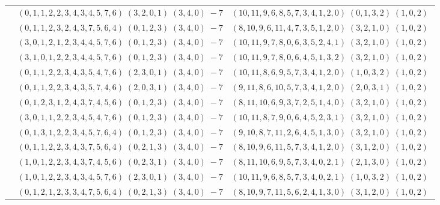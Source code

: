 \documentclass[11pt]{article}
\begin{document}
\begin{longtable}[l]{|c|c|c|}
 \cline{2-3} 
 & $(0 ,1 ,1 ,2 ,2 ,3 ,4 ,3 ,4 ,5 ,7 ,6) \;(3 ,2 ,0 ,1) \;(3 ,4 ,0) \;-7$ & $(10 ,11 ,9 ,6 ,8 ,5 ,7 ,3 ,4 ,1 ,2 ,0) \;(0 ,1 ,3 ,2) \;(1 ,0 ,2) \;$\\ 
 \cline{2-3} 
 & $(0 ,1 ,1 ,2 ,3 ,2 ,4 ,3 ,7 ,5 ,6 ,4) \;(0 ,1 ,2 ,3) \;(3 ,4 ,0) \;-7$ & $(8 ,10 ,9 ,6 ,11 ,4 ,7 ,3 ,5 ,1 ,2 ,0) \;(3 ,2 ,1 ,0) \;(1 ,0 ,2) \;$\\ 
 \cline{2-3} 
 & $(3 ,0 ,1 ,2 ,1 ,2 ,3 ,4 ,4 ,5 ,7 ,6) \;(0 ,1 ,2 ,3) \;(3 ,4 ,0) \;-7$ & $(10 ,11 ,9 ,7 ,8 ,0 ,6 ,3 ,5 ,2 ,4 ,1) \;(3 ,2 ,1 ,0) \;(1 ,0 ,2) \;$\\ 
 \cline{2-3} 
 & $(3 ,1 ,0 ,1 ,2 ,2 ,3 ,4 ,4 ,5 ,7 ,6) \;(0 ,1 ,2 ,3) \;(3 ,4 ,0) \;-7$ & $(10 ,11 ,9 ,7 ,8 ,0 ,6 ,4 ,5 ,1 ,3 ,2) \;(3 ,2 ,1 ,0) \;(1 ,0 ,2) \;$\\ 
 \cline{2-3} 
 & $(0 ,1 ,1 ,2 ,2 ,3 ,4 ,3 ,5 ,4 ,7 ,6) \;(2 ,3 ,0 ,1) \;(3 ,4 ,0) \;-7$ & $(10 ,11 ,8 ,6 ,9 ,5 ,7 ,3 ,4 ,1 ,2 ,0) \;(1 ,0 ,3 ,2) \;(1 ,0 ,2) \;$\\ 
 \cline{2-3} 
 & $(0 ,1 ,1 ,2 ,2 ,3 ,4 ,3 ,5 ,7 ,4 ,6) \;(2 ,0 ,3 ,1) \;(3 ,4 ,0) \;-7$ & $(9 ,11 ,8 ,6 ,10 ,5 ,7 ,3 ,4 ,1 ,2 ,0) \;(2 ,0 ,3 ,1) \;(1 ,0 ,2) \;$\\ 
 \cline{2-3} 
 & $(0 ,1 ,2 ,3 ,1 ,2 ,4 ,3 ,7 ,4 ,5 ,6) \;(0 ,1 ,2 ,3) \;(3 ,4 ,0) \;-7$ & $(8 ,11 ,10 ,6 ,9 ,3 ,7 ,2 ,5 ,1 ,4 ,0) \;(3 ,2 ,1 ,0) \;(1 ,0 ,2) \;$\\ 
 \cline{2-3} 
 & $(3 ,0 ,1 ,1 ,2 ,2 ,3 ,4 ,5 ,4 ,7 ,6) \;(0 ,1 ,2 ,3) \;(3 ,4 ,0) \;-7$ & $(10 ,11 ,8 ,7 ,9 ,0 ,6 ,4 ,5 ,2 ,3 ,1) \;(3 ,2 ,1 ,0) \;(1 ,0 ,2) \;$\\ 
 \cline{2-3} 
 & $(0 ,1 ,3 ,1 ,2 ,2 ,3 ,4 ,5 ,7 ,6 ,4) \;(0 ,1 ,2 ,3) \;(3 ,4 ,0) \;-7$ & $(9 ,10 ,8 ,7 ,11 ,2 ,6 ,4 ,5 ,1 ,3 ,0) \;(3 ,2 ,1 ,0) \;(1 ,0 ,2) \;$\\ 
 \cline{2-3} 
 & $(0 ,1 ,1 ,2 ,2 ,3 ,4 ,3 ,7 ,5 ,6 ,4) \;(0 ,2 ,1 ,3) \;(3 ,4 ,0) \;-7$ & $(8 ,10 ,9 ,6 ,11 ,5 ,7 ,3 ,4 ,1 ,2 ,0) \;(3 ,1 ,2 ,0) \;(1 ,0 ,2) \;$\\ 
 \cline{2-3} 
 & $(1 ,0 ,1 ,2 ,2 ,3 ,4 ,3 ,7 ,4 ,5 ,6) \;(0 ,2 ,3 ,1) \;(3 ,4 ,0) \;-7$ & $(8 ,11 ,10 ,6 ,9 ,5 ,7 ,3 ,4 ,0 ,2 ,1) \;(2 ,1 ,3 ,0) \;(1 ,0 ,2) \;$\\ 
 \cline{2-3} 
 & $(1 ,0 ,1 ,2 ,2 ,3 ,4 ,3 ,4 ,5 ,7 ,6) \;(2 ,3 ,0 ,1) \;(3 ,4 ,0) \;-7$ & $(10 ,11 ,9 ,6 ,8 ,5 ,7 ,3 ,4 ,0 ,2 ,1) \;(1 ,0 ,3 ,2) \;(1 ,0 ,2) \;$\\ 
 \cline{2-3} 
 & $(0 ,1 ,2 ,1 ,2 ,3 ,3 ,4 ,7 ,5 ,6 ,4) \;(0 ,2 ,1 ,3) \;(3 ,4 ,0) \;-7$ & $(8 ,10 ,9 ,7 ,11 ,5 ,6 ,2 ,4 ,1 ,3 ,0) \;(3 ,1 ,2 ,0) \;(1 ,0 ,2) \;$\\ 

\end{longtable}
\end{document}
